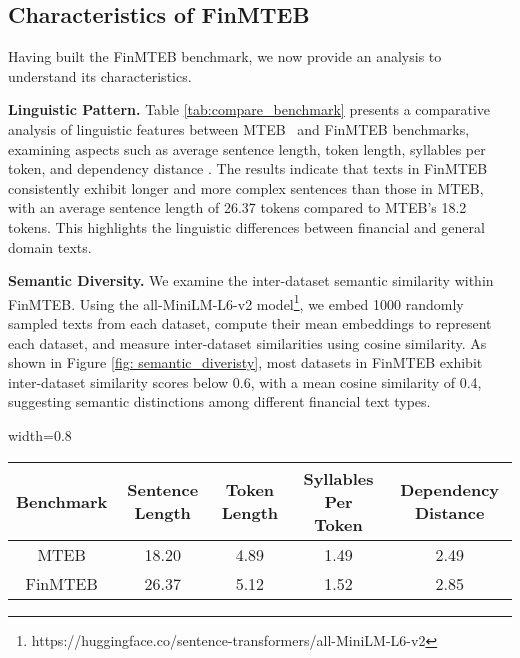 \subsection{Characteristics of FinMTEB}
Having built the FinMTEB benchmark, we now provide an analysis to understand its characteristics. 

\textbf{Linguistic Pattern.} Table \ref{tab:compare_benchmark} presents a comparative analysis of linguistic features between MTEB~\citep{mteb} and FinMTEB benchmarks, examining aspects such as average sentence length, token length, syllables per token, and dependency distance \citep{dependency_distance}. The results indicate that texts in FinMTEB consistently exhibit longer and more complex sentences than those in MTEB, with an average sentence length of 26.37 tokens compared to MTEB's 18.2 tokens. This highlights the linguistic differences between financial and general domain texts.


\textbf{Semantic Diversity.} We examine the inter-dataset semantic similarity within FinMTEB. Using the all-MiniLM-L6-v2 model\footnote{https://huggingface.co/sentence-transformers/all-MiniLM-L6-v2}, we embed 1000 randomly sampled texts from each dataset, compute their mean embeddings to represent each dataset, and measure inter-dataset similarities using cosine similarity. As shown in Figure \ref{fig: semantic_diveristy}, most datasets in FinMTEB exhibit inter-dataset similarity scores below 0.6, with a mean cosine similarity of 0.4, suggesting semantic distinctions among different financial text types.


\begin{center}
    \begin{table*}[htb]
    \centering
    \begin{adjustbox}{width=0.8\linewidth}
    \begin{tabular}{ccccc}
        \toprule 
        \textbf{Benchmark} & \textbf{Sentence Length} & \textbf{Token Length}  & \textbf{Syllables Per Token} & \textbf{Dependency Distance}  \\
        \midrule
         MTEB & 18.20 & 4.89 & 1.49 & 2.49\\
        FinMTEB & 26.37 & 5.12 & 1.52 & 2.85\\
        \bottomrule
    \end{tabular}
    \end{adjustbox}
    \caption{Comparison of Text Characteristics Between FinMTEB and MTEB. The numbers represent the average scores across all samples from all datasets.}
    \label{tab:compare_benchmark}
    \end{table*}
\end{center}